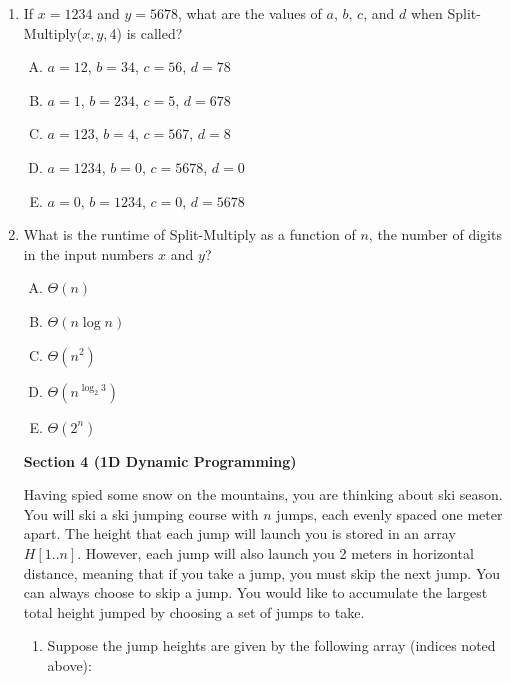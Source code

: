 \documentclass[11pt]{article}
\begin{document}
\begin{enumerate}
\item If $x=1234$ and $y=5678$, what are the values of $a$, $b$, $c$, and $d$ when
Split-Multiply($x,y,4$) is called?
\begin{enumerate}[A.]
    \item $a=12$, $b=34$, $c=56$, $d=78$
    \item $a=1$, $b=234$, $c=5$, $d=678$
    \item $a=123$, $b=4$, $c=567$, $d=8$
    \item $a=1234$, $b=0$, $c=5678$, $d=0$
    \item $a=0$, $b=1234$, $c=0$, $d=5678$  
\end{enumerate}

\item What is the runtime of Split-Multiply as a function of $n$, the number of digits
in the input numbers $x$ and $y$?
\begin{enumerate}[A.]
    \item $\Theta(n)$
    \item $\Theta(n \log n)$
    \item $\Theta(n^2)$
    \item $\Theta(n^{\log_2 3})$
    \item $\Theta(2^n)$
\end{enumerate}
\newpage


\begin{center}
\LARGE\textbf{Section 4 (1D Dynamic Programming)\\}%
\end{center}

Having spied some snow on the mountains, you are thinking
about ski season. You will ski a ski jumping course with $n$ jumps, each evenly spaced one
meter apart. The height that each jump will launch you is stored in an array $H[1..n]$. However,
each jump will also launch you 2 meters in horizontal distance, meaning that if you take a jump,
you must skip the next jump. You can always choose to skip a jump.
You would like to accumulate the largest total height jumped by choosing a set of jumps to take. 

\begin{enumerate}
    \item Suppose the jump heights are given by the following array (indices noted above):
    \begin{center}
    \end{center}


\end{enumerate}
\end{enumerate}
\end{document}
